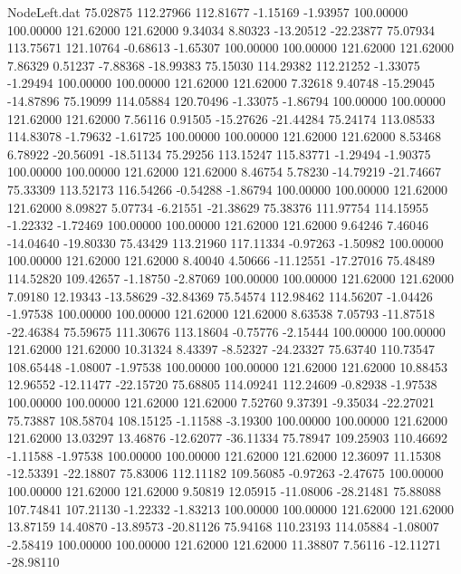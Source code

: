 \begin{filecontents}{NodeLeft.dat}
  75.02875  112.27966  112.81677    -1.15169   -1.93957  100.00000  100.00000  121.62000  121.62000    9.34034    8.80323  -13.20512  -22.23877
  75.07934  113.75671  121.10764    -0.68613   -1.65307  100.00000  100.00000  121.62000  121.62000    7.86329    0.51237   -7.88368  -18.99383
  75.15030  114.29382  112.21252    -1.33075   -1.29494  100.00000  100.00000  121.62000  121.62000    7.32618    9.40748  -15.29045  -14.87896
  75.19099  114.05884  120.70496    -1.33075   -1.86794  100.00000  100.00000  121.62000  121.62000    7.56116    0.91505  -15.27626  -21.44284
  75.24174  113.08533  114.83078    -1.79632   -1.61725  100.00000  100.00000  121.62000  121.62000    8.53468    6.78922  -20.56091  -18.51134
  75.29256  113.15247  115.83771    -1.29494   -1.90375  100.00000  100.00000  121.62000  121.62000    8.46754    5.78230  -14.79219  -21.74667
  75.33309  113.52173  116.54266    -0.54288   -1.86794  100.00000  100.00000  121.62000  121.62000    8.09827    5.07734   -6.21551  -21.38629
  75.38376  111.97754  114.15955    -1.22332   -1.72469  100.00000  100.00000  121.62000  121.62000    9.64246    7.46046  -14.04640  -19.80330
  75.43429  113.21960  117.11334    -0.97263   -1.50982  100.00000  100.00000  121.62000  121.62000    8.40040    4.50666  -11.12551  -17.27016
  75.48489  114.52820  109.42657    -1.18750   -2.87069  100.00000  100.00000  121.62000  121.62000    7.09180   12.19343  -13.58629  -32.84369
  75.54574  112.98462  114.56207    -1.04426   -1.97538  100.00000  100.00000  121.62000  121.62000    8.63538    7.05793  -11.87518  -22.46384
  75.59675  111.30676  113.18604    -0.75776   -2.15444  100.00000  100.00000  121.62000  121.62000   10.31324    8.43397   -8.52327  -24.23327
  75.63740  110.73547  108.65448    -1.08007   -1.97538  100.00000  100.00000  121.62000  121.62000   10.88453   12.96552  -12.11477  -22.15720
  75.68805  114.09241  112.24609    -0.82938   -1.97538  100.00000  100.00000  121.62000  121.62000    7.52760    9.37391   -9.35034  -22.27021
  75.73887  108.58704  108.15125    -1.11588   -3.19300  100.00000  100.00000  121.62000  121.62000   13.03297   13.46876  -12.62077  -36.11334
  75.78947  109.25903  110.46692    -1.11588   -1.97538  100.00000  100.00000  121.62000  121.62000   12.36097   11.15308  -12.53391  -22.18807
  75.83006  112.11182  109.56085    -0.97263   -2.47675  100.00000  100.00000  121.62000  121.62000    9.50819   12.05915  -11.08006  -28.21481
  75.88088  107.74841  107.21130    -1.22332   -1.83213  100.00000  100.00000  121.62000  121.62000   13.87159   14.40870  -13.89573  -20.81126
  75.94168  110.23193  114.05884    -1.08007   -2.58419  100.00000  100.00000  121.62000  121.62000   11.38807    7.56116  -12.11271  -28.98110

\end{filecontents}
